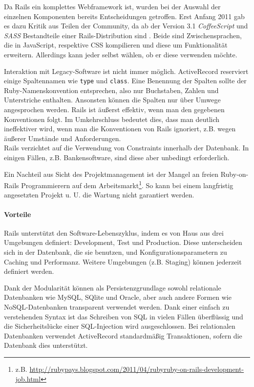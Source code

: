 Da Rails ein komplettes Webframework ist, wurden bei der Auswahl der einzelnen Komponenten bereits Entscheidungen getroffen.  Erst Anfang 2011 gab es dazu Kritik aus Teilen der Community, da ab der Version 3.1 \textit{CoffeeScript} und \textit{SASS} Bestandteile einer Rails-Distribution sind \citep{peter_cooper_rails_2011}. Beide sind Zwischensprachen, die in JavaScript, respektive CSS kompilieren und diese um Funktionalität erweitern. Allerdings kann jeder selbst wählen, ob er diese verwenden möchte.


Interaktion mit Legacy-Software ist nicht immer möglich. ActiveRecord reserviert einige Spaltennamen wie \texttt{type} und \texttt{class}. Eine Benennung der Spalten sollte der Ruby-Namenskonvention entsprechen, also nur Buchstaben, Zahlen und Unterstriche enthalten. Ansonsten können die Spalten nur über Umwege angesprochen werden. Rails ist äußerst effektiv, wenn man den gegebenen Konventionen folgt. Im Umkehrschluss bedeutet dies, dass man deutlich ineffektiver wird, wenn man die Konventionen von Rails ignoriert, z.B. wegen äußerer Umstände und Anforderungen.\\
Rails verzichtet auf die Verwendung von Constraints innerhalb der Datenbank. In einigen Fällen, z.B. Bankensoftware, sind diese aber unbedingt erforderlich.

Ein Nachteil aus Sicht des Projektmanagement ist der Mangel an freien Ruby-on-Rails Programmierern auf dem Arbeitsmarkt\footnote{z.B. \url{http://rubypays.blogspot.com/2011/04/rubyruby-on-rails-development-job.html}}. So kann bei einem langfristig angesetzten Projekt u. U. die Wartung nicht garantiert werden.

\paragraph{Vorteile}
Rails unterstützt den Software-Lebenszyklus, indem es von Haus aus drei Umgebungen definiert: Development, Test und Production. Diese unterscheiden sich in der Datenbank, die sie benutzen, und Konfigurationsparametern zu Caching und Performanz. Weitere Umgebungen (z.B. Staging) können jederzeit definiert werden.


Dank der Modularität können als Persistenzgrundlage sowohl relationale Datenbanken wie MySQL, SQlite und Oracle, aber auch andere Formen wie NoSQL-Datenbanken transparent verwendet werden. Dank einer einfach zu verstehenden Syntax ist das Schreiben von SQL in vielen Fällen überflüssig und die Sicherheitslücke einer SQL-Injection wird ausgeschlossen. Bei relationalen Datenbanken verwendet ActiveRecord standardmäßig Transaktionen, sofern die Datenbank dies unterstützt.



